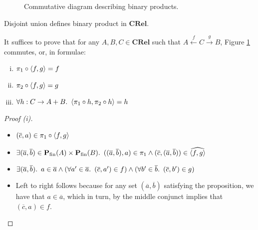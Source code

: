 \begin{figure}
  \caption{Commutative diagram describing binary products.}\label{fig:crel-products}
  \begin{center}
  \end{center}
\end{figure}

\begin{prop}
  Disjoint union defines binary product in $\mathbf{CRel}$.

  It suffices to prove that for any $A,B,C\in\mathbf{CRel}$ such that ${A\overset{f}\longleftarrow C\overset{g}\longrightarrow B}$, Figure \ref{fig:crel-products} commutes, or, in formulae:

  \begin{enumerate}[(i)]
    \item $\pi_1\circ\langle f, g\rangle = f$
    \item $\pi_2\circ\langle f, g\rangle = g$
    \item $\forall h : C\to A+B\ldotp~\langle\pi_1\circ h,\pi_2\circ h\rangle = h$
  \end{enumerate}

  \begin{proof}[Proof (i)]
    \begin{itemize}
      \item[\phantom{\imps}]
        $(\overline{c},a)\in\pi_1\circ\langle f,g\rangle$

      \item[\iffs]
        $\exists(\overline{a},\overline{b})\in\mathbf{P}_{\operatorname{fin}}(A)\times\mathbf{P}_{\operatorname{fin}}(B)\ldotp~((\overline{a},\overline{b}),a)\in\pi_1\land(\overline{c},(\overline{a},\overline{b}))\in\widehat{\langle f,g\rangle}$
        \marginnote{\Def-\ref{def:crel-comp}}

      \item[\iffs]
        $\exists(\overline{a},\overline{b})\ldotp~a\in\overline{a}\land(\forall a^\prime\in\overline{a}\ldotp~(\overline{c},a^\prime)\in f)\land(\forall b^\prime\in\overline{b}\ldotp~(\overline{c},b^\prime)\in g)$

      \item[\phantom{\imps}]
        Left to right follows because for any set $(\overline{a},\overline{b})$ satisfying the proposition, we have that $a\in\overline{a}$, which in turn, by the middle conjunct implies that $(\overline{c},a)\in f$.


\end{itemize}
\end{proof}
\end{prop}
